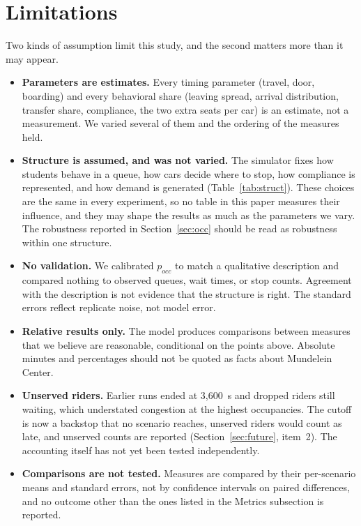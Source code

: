 \section{Limitations}

Two kinds of assumption limit this study, and the second matters more than it may appear.

\begin{itemize}
\item \textbf{Parameters are estimates.} Every timing parameter (travel, door, boarding) and every behavioral
share (leaving spread, arrival distribution, transfer share, compliance, the two extra seats per car) is an
estimate, not a measurement. We varied several of them and the ordering of the measures held.
\item \textbf{Structure is assumed, and was not varied.} The simulator fixes how students behave in a queue,
how cars decide where to stop, how compliance is represented, and how demand is generated
(Table~\ref{tab:struct}). These choices are the same in every experiment, so no table in this paper measures their
influence, and they may shape the results as much as the parameters we vary. The robustness reported in
Section~\ref{sec:occ} should be read as robustness within one structure.
\item \textbf{No validation.} We calibrated $p_{occ}$ to match a qualitative description and compared nothing to
observed queues, wait times, or stop counts. Agreement with the description is not evidence that the structure is
right. The standard errors reflect replicate noise, not model error.
\item \textbf{Relative results only.} The model produces comparisons between measures that we believe are
reasonable, conditional on the points above. Absolute minutes and percentages should not be quoted as facts about
Mundelein Center.
\item \textbf{Unserved riders.} Earlier runs ended at 3{,}600~s and dropped riders still waiting, which understated
congestion at the highest occupancies. The cutoff is now a backstop that no scenario reaches, unserved riders would
count as late, and unserved counts are reported (Section~\ref{sec:future}, item~2). The accounting itself has not yet
been tested independently.
\item \textbf{Comparisons are not tested.} Measures are compared by their per-scenario means and standard errors,
not by confidence intervals on paired differences, and no outcome other than the ones listed in the Metrics
subsection is reported.

\end{itemize}
